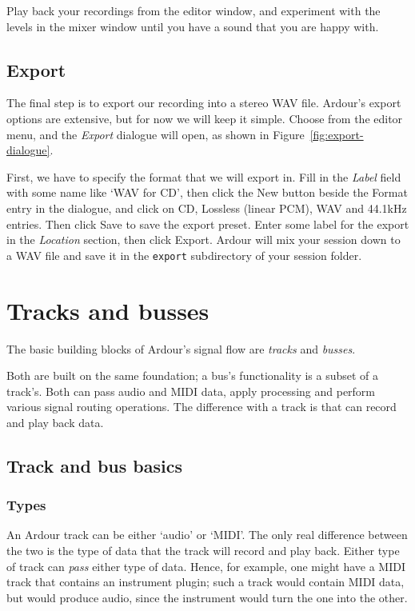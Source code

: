 \documentclass[10pt,a4paper]{book}
\newcommand{\button}[1]{#1}
\newcommand{\menu}[1]{\emph{\StrSubstitute{#1}{,}{ $\rightarrow$ }}}
\newcommand{\directory}[1]{\texttt{#1}}
\begin{document}
Play back your recordings from the editor window, and experiment with
the levels in the mixer window until you have a sound that you are
happy with.


\section{Export}

The final step is to export our recording into a stereo WAV file.
Ardour's export options are extensive, but for now we will keep it
simple.  Choose \menu{Session,Export,Export to Audio Files} from the
editor menu, and the \emph{Export} dialogue will open, as shown in
Figure~\ref{fig:export-dialogue}.

First, we have to specify the format that we will export in.  Fill in
the \emph{Label} field with some name like `WAV for CD', then click
the \button{New} button beside the Format entry in the dialogue, and
click on \button{CD}, \button{Lossless (linear PCM)}, \button{WAV} and
\button{44.1kHz} entries.  Then click \button{Save} to save the export
preset.  Enter some label for the export in the \emph{Location}
section, then click \button{Export}.  Ardour will mix your session
down to a WAV file and save it in the \directory{export} subdirectory of
your session folder.


\chapter{Tracks and busses}

The basic building blocks of Ardour's signal flow are \emph{tracks}
and \emph{busses}.

Both are built on the same foundation; a bus's functionality is a
subset of a track's.  Both can pass audio and MIDI data, apply
processing and perform various signal routing operations.  The
difference with a track is that can record and play back data.

\section{Track and bus basics}

\subsection{Types}

An Ardour track can be either `audio' or `MIDI'.  The only real
difference between the two is the type of data that the track will
record and play back.  Either type of track can \emph{pass} either
type of data.  Hence, for example, one might have a MIDI track that
contains an instrument plugin; such a track would contain MIDI data,
but would produce audio, since the instrument would turn the one into
the other.
\end{document}
